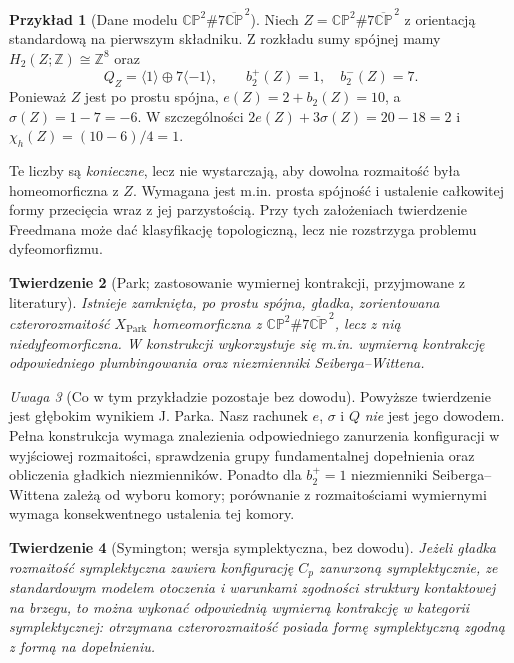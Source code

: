 \documentclass[11pt,a4paper]{report}
\numberwithin{equation}{section}
\theoremstyle{plain}
\newtheorem{twierdzenie}{Twierdzenie}[section]
\theoremstyle{definition}
\newtheorem{przyklad}[twierdzenie]{Przykład}
\theoremstyle{remark}
\newtheorem{uwaga}[twierdzenie]{Uwaga}
\begin{document}
\begin{przyklad}[Dane modelu $\mathbb{CP}^2\#7\overline{\mathbb{CP}}^{\,2}$]
Niech $Z=\mathbb{CP}^2\#7\overline{\mathbb{CP}}^{\,2}$
z orientacją standardową na pierwszym składniku.
Z rozkładu sumy spójnej mamy
$H_2(Z;\mathbb Z)\cong\mathbb Z^8$ oraz
\[
Q_Z=\langle1\rangle\oplus7\langle-1\rangle,
\qquad b_2^+(Z)=1,\quad b_2^-(Z)=7.
\]
Ponieważ $Z$ jest po prostu spójna,
$e(Z)=2+b_2(Z)=10$, a
$\sigma(Z)=1-7=-6$. W szczególności
$2e(Z)+3\sigma(Z)=20-18=2$ i
$\chi_h(Z)=(10-6)/4=1$.

Te liczby są \emph{konieczne}, lecz nie wystarczają,
aby dowolna rozmaitość była homeomorficzna z $Z$.
Wymagana jest m.in. prosta spójność i ustalenie
całkowitej formy przecięcia wraz z jej parzystością.
Przy tych założeniach twierdzenie Freedmana
może dać klasyfikację topologiczną, lecz nie
rozstrzyga problemu dyfeomorfizmu.
\end{przyklad}

\begin{twierdzenie}[Park; zastosowanie wymiernej kontrakcji,
przyjmowane z literatury]
Istnieje zamknięta, po prostu spójna, gładka,
zorientowana czterorozmaitość $X_{\mathrm{Park}}$
homeomorficzna z
$\mathbb{CP}^2\#7\overline{\mathbb{CP}}^{\,2}$,
lecz z nią niedyfeomorficzna. W konstrukcji
wykorzystuje się m.in. wymierną kontrakcję
odpowiedniego plumbingowania oraz niezmienniki
Seiberga--Wittena.
\end{twierdzenie}

\begin{uwaga}[Co w tym przykładzie pozostaje bez dowodu]
Powyższe twierdzenie jest głębokim wynikiem J. Parka.
Nasz rachunek $e$, $\sigma$ i $Q$ \emph{nie} jest
jego dowodem. Pełna konstrukcja wymaga znalezienia
odpowiedniego zanurzenia konfiguracji w wyjściowej
rozmaitości, sprawdzenia grupy fundamentalnej
dopełnienia oraz obliczenia gładkich niezmienników.
Ponadto dla $b_2^+=1$ niezmienniki
Seiberga--Wittena zależą od wyboru komory;
porównanie z rozmaitościami wymiernymi wymaga
konsekwentnego ustalenia tej komory.
\end{uwaga}

\begin{twierdzenie}[Symington; wersja symplektyczna, bez dowodu]
Jeżeli gładka rozmaitość symplektyczna zawiera
konfigurację $C_p$ zanurzoną symplektycznie,
ze standardowym modelem otoczenia i warunkami
zgodności struktury kontaktowej na brzegu,
to można wykonać odpowiednią wymierną kontrakcję
w kategorii symplektycznej: otrzymana czterorozmaitość
posiada formę
symplektyczną zgodną z formą na dopełnieniu.
\end{twierdzenie}
\end{document}

